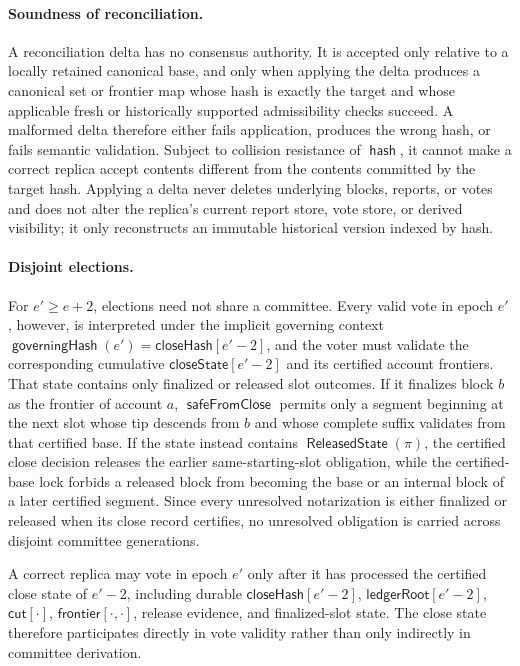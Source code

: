 \documentclass[sigplan,twocolumn,review,anonymous]{acmart}
\newcommand{\func}[1]{\operatorname{\mathsf{#1}}}
\newcommand{\hash}{\func{hash}}
\newcommand{\frontier}{\mathsf{frontier}}
\newcommand{\ledgerRoot}{\mathsf{ledgerRoot}}
\newcommand{\closeHash}{\mathsf{closeHash}}
\newcommand{\closeCut}{\mathsf{cut}}
\newcommand{\closeState}{\mathsf{closeState}}
\newcommand{\governingHash}{\func{governingHash}}
\newcommand{\safeFromClose}{\func{safeFromClose}}
\newcommand{\ReleasedState}{\func{ReleasedState}}
\begin{document}
\paragraph{Soundness of reconciliation.}
A reconciliation delta has no consensus authority.  It is accepted only relative to a locally retained
canonical base, and only when applying the delta produces a canonical set or frontier map whose hash is
exactly the target and whose applicable fresh or historically supported admissibility checks succeed.  A malformed delta therefore either
fails application, produces the wrong hash, or fails semantic validation.  Subject to collision
resistance of \(\hash\), it cannot make a correct replica accept contents different from the contents
committed by the target hash.  Applying a delta never deletes underlying blocks, reports, or votes and
does not alter the replica's current report store, vote store, or derived visibility; it only reconstructs
an immutable historical version indexed by hash.

\paragraph{Disjoint elections.}
For \(e'\ge e+2\), elections need not share a committee.  Every valid vote in epoch \(e'\), however,
is interpreted under the implicit governing context
\(\governingHash(e')=\closeHash[e'-2]\), and the voter must validate the corresponding cumulative
\(\closeState[e'-2]\) and its certified account frontiers.  That state contains only finalized or
released slot outcomes.  If it finalizes block \(b\) as the frontier of account \(a\),
\(\safeFromClose\) permits only a segment beginning at the next slot whose tip descends from \(b\) and whose complete suffix validates from that certified base.  If the state instead contains \(\ReleasedState(\pi)\), the
certified close decision releases the earlier same-starting-slot obligation, while the certified-base lock forbids a released block from becoming the base or an internal block of a later certified segment.  Since every unresolved
notarization is either finalized or released when its close record certifies, no unresolved obligation
is carried across disjoint committee generations.

A correct replica may vote in epoch \(e'\) only after it has processed the certified close state of
\(e'-2\), including durable \(\closeHash[e'-2]\), \(\ledgerRoot[e'-2]\), \(\closeCut[\cdot]\),
\(\frontier[\cdot,\cdot]\), release evidence, and finalized-slot state.  The close state therefore
participates directly in vote validity rather than only indirectly in committee derivation.
\end{document}
